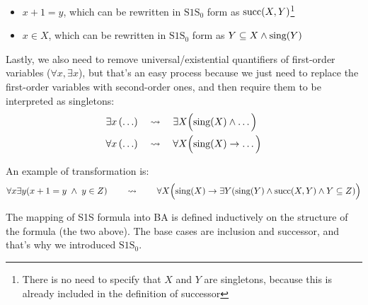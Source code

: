 \documentclass[oneside]{academica}
\begin{document}
\begin{proof*}
\begin{itemize}
\begin{itemize}
        \item $x+1 = y$, which can be rewritten in $\text{S1S}_0$ form as $\text{succ}(X,Y)$\footnote{There is no need to specify that $X$ and $Y$ are singletons, because this is already included in the definition of successor}
        \item $x \in X$, which can be rewritten in $\text{S1S}_0$ form as $Y \subseteq X \land \text{sing}(Y)$
      \end{itemize}
      Lastly, we also need to remove universal/existential quantifiers of first-order variables ($\forall x, \exists x$), but that's an easy process because we just need to replace the first-order variables with second-order ones, and then require them to be interpreted as singletons:
      \vspace{-10pt}
      \begin{align*}
        & \exists x \left( \ldots \right) \quad \leadsto \quad \exists X \Big( \text{sing}(X) \land \ldots \Big) \\
        & \forall x \left( \ldots \right) \quad \leadsto \quad \forall X \Big( \text{sing}(X) \to \ldots \Big)
      \end{align*}
  \end{itemize}
\end{proof*}

An example of transformation is:
\begin{equation*}
  \forall x \exists y (x+1=y\;\land\; y \in Z) \qquad \leadsto \qquad \forall X \Big( \text{sing}(X) \to \exists Y (\text{sing}(Y) \land \text{succ}(X,Y) \land Y \subseteq Z) \Big)
\end{equation*}

The mapping of S1S formula into BA is defined inductively on the structure of the formula (the two above).
The base cases are inclusion and successor, and that's why we introduced $\text{S1S}_0$.
\end{document}
